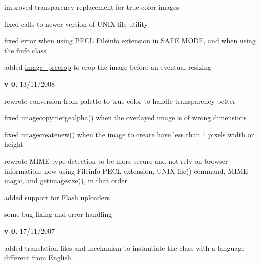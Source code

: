 \begin{DoxyItemize}
\begin{DoxyItemize}
\item improved transparency replacement for true color images~\newline

\item fixed calls to newer version of U\+N\+I\+X file utility~\newline

\item fixed error when using P\+E\+C\+L Fileinfo extension in S\+A\+F\+E M\+O\+D\+E, and when using the finfo class~\newline

\item added \hyperlink{}{image\+\_\+precrop} to crop the image before an eventual resizing 
\end{DoxyItemize}
\item {\bfseries v 0.} 13/11/2008~\newline

\begin{DoxyItemize}
\item rewrote conversion from palette to true color to handle transparency better~\newline

\item fixed imagecopymergealpha() when the overlayed image is of wrong dimensions~\newline

\item fixed imagecreatenew() when the image to create have less than 1 pixels width or height~\newline

\item rewrote M\+I\+M\+E type detection to be more secure and not rely on browser information; now using Fileinfo P\+E\+C\+L extension, U\+N\+I\+X file() command, M\+I\+M\+E magic, and getimagesize(), in that order~\newline

\item added support for Flash uploaders~\newline

\item some bug fixing and error handling 
\end{DoxyItemize}
\item {\bfseries v 0.} 17/11/2007~\newline

\begin{DoxyItemize}
\item added translation files and mechanism to instantiate the class with a language different from English~\newline


\end{DoxyItemize}
\end{DoxyItemize}
